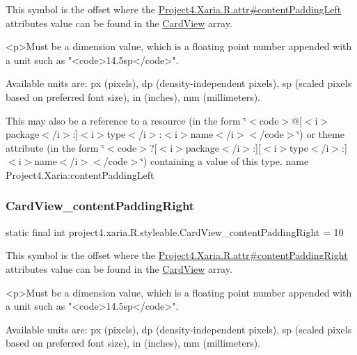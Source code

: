 This symbol is the offset where the \hyperlink{}{Project4.\+Xaria.\+R.\+attr\#content\+Padding\+Left} attribute\textquotesingle{}s value can be found in the \hyperlink{classproject4_1_1xaria_1_1R_1_1styleable_abef2e3d3e2b11dd786470094dbc57ea4}{Card\+View} array.

\begin{DoxyVerb}      <p>Must be a dimension value, which is a floating point number appended with a unit such as "<code>14.5sp</code>".
\end{DoxyVerb}
 Available units are\+: px (pixels), dp (density-\/independent pixels), sp (scaled pixels based on preferred font size), in (inches), mm (millimeters). 

This may also be a reference to a resource (in the form \char`\"{}$<$code$>$@\mbox{[}$<$i$>$package$<$/i$>$\+:\mbox{]}$<$i$>$type$<$/i$>$\+:$<$i$>$name$<$/i$>$$<$/code$>$\char`\"{}) or theme attribute (in the form \char`\"{}$<$code$>$?\mbox{[}$<$i$>$package$<$/i$>$\+:\mbox{]}\mbox{[}$<$i$>$type$<$/i$>$\+:\mbox{]}$<$i$>$name$<$/i$>$$<$/code$>$\char`\"{}) containing a value of this type.  name Project4.\+Xaria\+:content\+Padding\+Left \mbox{\label{classproject4_1_1xaria_1_1R_1_1styleable_a7989c5540f66e224b4c50c22a263699d}} 
\subsubsection{\texorpdfstring{Card\+View\+\_\+content\+Padding\+Right}{CardView\_contentPaddingRight}}
{\footnotesize\ttfamily static final int project4.\+xaria.\+R.\+styleable.\+Card\+View\+\_\+content\+Padding\+Right = 10\hspace{0.3cm}{\ttfamily [static]}}

This symbol is the offset where the \hyperlink{}{Project4.\+Xaria.\+R.\+attr\#content\+Padding\+Right} attribute\textquotesingle{}s value can be found in the \hyperlink{classproject4_1_1xaria_1_1R_1_1styleable_abef2e3d3e2b11dd786470094dbc57ea4}{Card\+View} array.

\begin{DoxyVerb}      <p>Must be a dimension value, which is a floating point number appended with a unit such as "<code>14.5sp</code>".
\end{DoxyVerb}
 Available units are\+: px (pixels), dp (density-\/independent pixels), sp (scaled pixels based on preferred font size), in (inches), mm (millimeters). 

